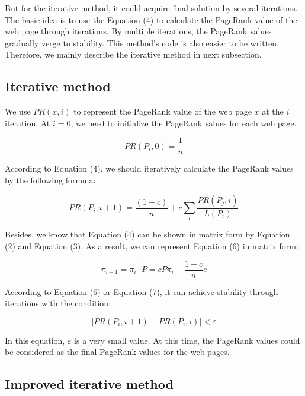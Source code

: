 \documentclass[lettersize,journal,12pt,conference]{IEEEtran}
\begin{document}
But for the iterative method, it could acquire final solution by several iterations. The basic idea is to use the Equation (4) to calculate the PageRank value of the web page through iterations. By multiple iterations, the PageRank values gradually verge to stability. This method's code is also easier to be written. Therefore, we mainly describe the iterative method in next subsection.

\subsection{Iterative method}

We use $PR(x, i)$ to represent the PageRank value of the web page $x$ at the $i$ iteration. At $i = 0$, we need to initialize the PageRank values for each web page.

\begin{equation}
	\label{eq:5}
	PR(P_i, 0) = \frac{1}{n}
\end{equation}

According to Equation (4), we should iteratively calculate the PageRank values by the following formula:

\begin{equation}
	\label{eq:6}
	PR(P_i, i+1) = \frac{(1 - c)}{n} + c \sum_{i} \frac{PR(P_j, i)}{L(P_i)}
\end{equation}

Besides, we know that Equation (4) can be shown in matrix form by Equation (2) and Equation (3). As a result, we can represent Equation (6) in matrix form:

\begin{equation}
	\label{eq:7}
	\pi_{i+1} = \pi_i \cdot \widetilde{P} = cP\pi_i + \frac{1 - c}{n} e
\end{equation}

According to Equation (6) or Equation (7), it can achieve stability through iterations with the condition:

\begin{equation}
	\label{eq:8}
	|PR(P_i, i+1) - PR(P_i, i)| < \varepsilon
\end{equation}

In this equation, \(\varepsilon\) is a very small value. At this time, the PageRank values could be considered as the final PageRank values for the web pages.

\subsection{Improved iterative method}
\end{document}
